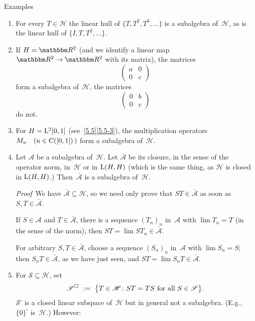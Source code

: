 \documentclass[main.tex]{subfiles}
\begin{document}
%
%
\begin{psec}{5.16}{Examples}
\begin{enumerate}
\item \label{5.16-1}
For every $T\in\mathscr H$
the linear hull of $\{T,T^2,T^3,\dotsc\}$
is a subalgebra of~$\mathscr H$,
as is the linear hull of $\{I,T,T^2,\dotsc\}$.
%
\item \label{5.16-2}
If $H=\R^2$ 
(and we identify a linear map $\R^2\ra\R^2$ with its matrix),
the matrices
\begin{equation*}
\begin{pmatrix}a&0\\0&c\end{pmatrix}
\end{equation*}
form a subalgebra of~$\mathscr H$,
the matrices
\begin{equation*}
\begin{pmatrix}0&b\\0&c\end{pmatrix}
\end{equation*}
do not.
%
\item \label{5.16-3}
For $H=\mathrm{L}^2[0,1]$ (see~\ref{5.5}\ref{5.5-3}),
the multiplication operators~$M_u\quad (u\in\mathrm{C}([0,1])\,)$
form a subalgebra of~$\mathscr{H}$.
%
\item \label{5.16-4}
Let $\mathscr{A}$ be a subalgebra of~$\mathscr{H}$.
Let $\bar{\mathscr{A}}$ be its closure,
in the sense of the operator norm,
in~$\mathscr{H}$ or in $\mathrm{L}(H,H)$
(which is the same thing,
as $\mathscr H$ is closed in $\mathrm{L}(H,H)$.)
Then~$\bar{\mathscr{A}}$ is a subalgebra of~$\mathscr H$.

\emph{Proof}\  We have $\bar{\mathscr A}\subseteq \mathscr H$,
so we need only prove that $ST\in\bar{\mathscr A}$
as soon as~$S,T\in\bar{\mathscr A}$.

If $S\in\mathscr A$ and $T\in \bar{\mathscr A}$,
there is a sequence $(T_n)_n$ in~$\mathscr A$
with $\lim T_n = T$ (in the sense of the norm);
then $ST = \lim ST_n\in \bar{\mathscr A}$.

For arbitrary $S,T\in\bar{\mathscr A}$,
choose a sequence $(S_n)_n$ in~$\mathscr A$ 
with $\lim S_n = S$;
then $S_n T\in \bar{\mathscr A}$,
as we have just seen,
and $ST=\lim S_n T\in \bar{\mathscr A}$.
%
\item \label{5.16-5}
For $\mathscr S \subseteq \mathscr H$, set
\begin{equation*}
{\mathscr S}^{\square} \ :=\ 
 \bigl\{ T\in \mathscr H\colon
 ST=TS\htam{ for all }S\in\mathscr S\bigr\}\htam{.}
\end{equation*}
${\mathscr S}^\square$ is a closed linear subspace of~$\mathscr H$
but in general not a subalgebra.
(E.g., $\{0\}^\square$ is~$\mathscr H$.)
However:


\end{enumerate}
\end{psec}
\end{document}
